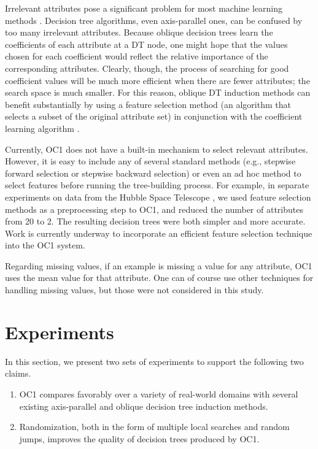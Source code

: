 Irrelevant attributes pose a significant problem for most machine
learning methods
\cite{breiman/etal/84,aha/90,almuallin/dietterich/91,%
kira/rendell/92,salzberg/92,cardie/93,schlimmer/93,langley/sage/93,%
brodley/utgoff/94}.  Decision tree algorithms, even axis-parallel
ones, can be confused by too many irrelevant attributes.  Because
oblique decision trees learn the coefficients of each attribute at a
DT node, one might hope that the values chosen for each coefficient
would reflect the relative importance of the corresponding attributes.
Clearly, though, the process of searching for good coefficient values
will be much more efficient when there are fewer attributes; the
search space is much smaller.  For this reason, oblique DT induction
methods can benefit substantially by using a feature selection method
(an algorithm that selects a subset of the original attribute set) in
conjunction with the coefficient learning algorithm
\cite{breiman/etal/84,brodley/utgoff/94}.

Currently, OC1 does not have a built-in mechanism to select relevant
attributes.  However, it is easy to include any of several standard
methods (e.g., stepwise forward selection or stepwise backward
selection) or even an ad hoc method to select features before running
the tree-building process.  For example, in separate experiments on
data from the Hubble Space Telescope \cite{salzberg/etal/94}, we used
feature selection methods as a preprocessing step to OC1, and reduced
the number of attributes from 20 to 2.  The resulting decision trees
were both simpler and more accurate.  Work is currently underway to
incorporate an efficient feature selection technique into the OC1
system.  

Regarding missing values, if an example is missing a value for any
attribute, OC1 uses the mean value for that attribute.  One can of
course use other techniques for handling missing values, but those
were not considered in this study.

\section{Experiments}
\label{section:exp}

In this section, we present two sets of experiments to support the
following two claims.
\begin{enumerate}
\item OC1 compares favorably over a variety of real-world domains
with several existing axis-parallel and oblique decision tree induction
methods.
\item Randomization, both in the form of multiple local searches and
random jumps, improves the quality of decision trees produced by OC1.
\end{enumerate}

